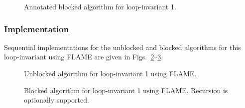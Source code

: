 \renewcommand{\afterupdate}{
\FlaThreeByThreeBR{ C_{00} }        { C_{01} }        { C_{02} }
                  { \undetermined } { C_{11}}         { C_{12} }
                  { \undetermined } { \undetermined } { C_{22} }
=
\FlaTwoByTwo { \hat{C}_{00} }
             { \FlaOneByTwoSingleLine{ \hat{C}_{01} }{ \hat{C}_{02} } }
             { \undetermined }
             { \FlaTwoByTwoSingleLine{ \hat{C}_{11} + A_1 A_1^T }{ \hat{C}_{12} + A_1 A_2^T }
                                     { \undetermined }{ \hat{C}_{22} + A_2 A_2^T} }   
\wedge \ldots
}

\renewcommand{\update}{
\begin{minipage}[t]{4in}
\noindent
$ C_{11} \becomes C_{11} + A_1 A_1^T $\\
$ C_{12} \becomes C_{12} + A_1 A_2^T $\\
\end{minipage}
}

\begin{figure}[htbp]
\worksheet
\caption{Annotated blocked algorithm for loop-invariant 1.}
\label{fig:ws:usyrk_unn_blk}
\end{figure}
%

\subsubsection{Implementation}

Sequential implementations for the unblocked and blocked algorithms
for this loop-invariant using FLAME are given in
Figs.~\ref{fig:syrk_unn_upleft_unb}--\ref{fig:syrk_unn_upleft_blk}.

\begin{figure}[htbp]
\footnotesize
\begin{quote}
\end{quote}
\caption{Unblocked algorithm for loop-invariant 1 using FLAME.}
\label{fig:syrk_unn_upleft_unb}
\end{figure}

\begin{figure}[htbp]
\footnotesize
{}%
\begin{quote}
\end{quote}
\caption{Blocked algorithm for loop-invariant 1 using FLAME.
Recursion is optionally supported.}
\label{fig:syrk_unn_upleft_blk}
\end{figure}


